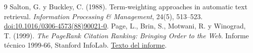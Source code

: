 \documentclass[11pt,letterpaper]{article}
\begin{document}
	\begin{thebibliography}{9}
		 Salton, G. y Buckley, C. (1988). Term-weighting approaches in automatic text retrieval. \emph{Information Processing \& Management}, 24(5), 513--523. \href{https://doi.org/10.1016/0306-4573(88)90021-0}{doi:10.1016/0306-4573(88)90021-0}.
		 Page, L., Brin, S., Motwani, R. y Winograd, T. (1999). \emph{The PageRank Citation Ranking: Bringing Order to the Web}. Informe técnico 1999-66, Stanford InfoLab. \href{https://storm.cis.fordham.edu/~gweiss/selected-papers/classic-pagerank-paper.pdf}{Texto del informe}.
	\end{thebibliography}
\end{document}
